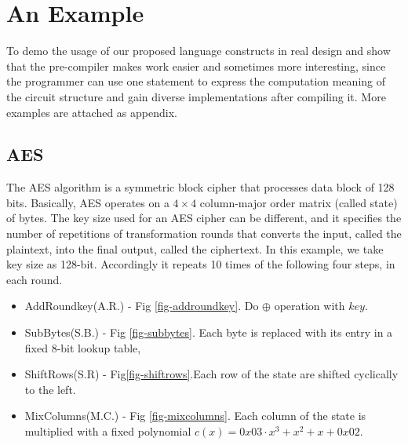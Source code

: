 \section{An Example}\label{sec:examples}
To demo the usage of our proposed language constructs in real design and show that the pre-compiler makes work easier and sometimes more interesting, since the programmer can use one statement to express the computation meaning of the circuit structure and gain diverse implementations after compiling it. More examples are attached as appendix.
\subsection{AES}
The AES\cite{AES} algorithm is a symmetric block cipher that processes data block of 128 bits.
Basically, AES operates on a \begin{math} 4 \times 4 \end{math} column-major order matrix (called state) of bytes. The key size used for an AES cipher can be different, and it specifies the number of repetitions of transformation rounds that converts the input, called the plaintext, into the final output, called the ciphertext.
In this example, we take key size as 128-bit. Accordingly it repeats 10 times of the following four steps, in each round.
\begin{itemize}
  \item AddRoundkey(A.R.) - Fig \ref{fig-addroundkey}. Do $\oplus$ operation with $key$.
  \item SubBytes(S.B.) - Fig \ref{fig-subbytes}. Each byte is replaced with its entry in a fixed 8-bit
        lookup table,
  \item ShiftRows(S.R) - Fig\ref{fig-shiftrows}.Each row of the state are shifted cyclically to the
        left.
  \item MixColumns(M.C.) - Fig \ref{fig-mixcolumns}. Each column of the state is multiplied with a fixed polynomial
        $c(x) = 0x03\cdot x^3 + x^2 + x + 0x02$.
\end{itemize}
